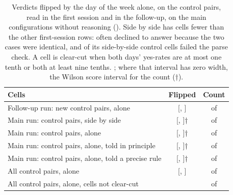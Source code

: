 \begin{table}[t]
\centering
\footnotesize
\begin{tabular}{lcc}
\toprule
Cells & Flipped & Count \\
\midrule
Follow-up run: new control pairs, alone & \DayFlipNewControls{} [\DayFlipNewControlsLo{}, \DayFlipNewControlsHi{}] & \DayFlipNewControlsNum{} of \DayFlipNewControlsDen{} \\
Main run: control pairs, side by side & \DayFlipFirstRunControlsSideBySide{} [\DayFlipFirstRunControlsSideBySideWilsonLo{}, \DayFlipFirstRunControlsSideBySideWilsonHi{}]† & \DayFlipFirstRunControlsSideBySideNum{} of \DayFlipFirstRunControlsSideBySideDen{} \\
Main run: control pairs, alone & \DayFlipFirstRunControlsAlone{} [\DayFlipFirstRunControlsAloneWilsonLo{}, \DayFlipFirstRunControlsAloneWilsonHi{}]† & \DayFlipFirstRunControlsAloneNum{} of \DayFlipFirstRunControlsAloneDen{} \\
Main run: control pairs, alone, told in principle & \DayFlipFirstRunControlsToldPrinciple{} [\DayFlipFirstRunControlsToldPrincipleWilsonLo{}, \DayFlipFirstRunControlsToldPrincipleWilsonHi{}]† & \DayFlipFirstRunControlsToldPrincipleNum{} of \DayFlipFirstRunControlsToldPrincipleDen{} \\
Main run: control pairs, alone, told a precise rule & \DayFlipFirstRunControlsToldRule{} [\DayFlipFirstRunControlsToldRuleWilsonLo{}, \DayFlipFirstRunControlsToldRuleWilsonHi{}]† & \DayFlipFirstRunControlsToldRuleNum{} of \DayFlipFirstRunControlsToldRuleDen{} \\
All control pairs, alone & \DayFlipAllControls{} [\DayFlipAllControlsLo{}, \DayFlipAllControlsHi{}] & \DayFlipAllControlsNum{} of \DayFlipAllControlsDen{} \\
All control pairs, alone, cells not clear-cut & \DayFlipUnsettled{} & \DayFlipUnsettledNum{} of \DayFlipUnsettledDen{} \\
\bottomrule
\end{tabular}
\caption{Verdicts flipped by the day of the week alone, on the \ControlPairsTotal{} control pairs, \ControlPairsFirstRun{} read in the first session and \ControlPairsFollowUp{} in the follow-up, on the \NumModelsMainNoReasoning{} main configurations without reasoning (\ControlModelsList{}). Side by side has \ControlSideInvalidCount{} cells fewer than the other first-session rows:  often declined to answer because the two cases were identical, and \ControlSideInvalidCount{} of its side-by-side control cells failed the parse check. A cell is clear-cut when both days' yes-rates are at most one tenth or both at least nine tenths. \IntervalsNote{}; where that interval has zero width, the Wilson score interval for the count (†).}
\label{tab:controls}
\end{table}

